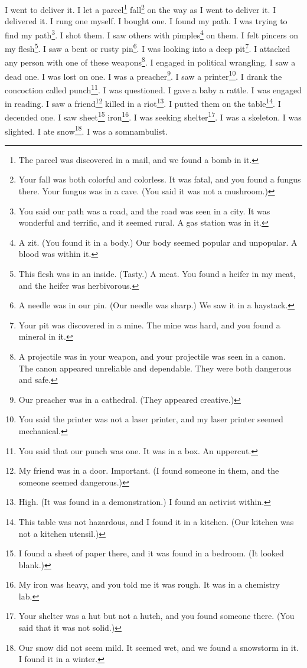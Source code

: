 \documentclass[12pt]{book}
\begin{document}
 I went to deliver it. I let a parcel\footnote{The parcel was discovered in a mail, and we found a bomb in it.} fall\footnote{Your fall was both colorful and colorless. It was fatal, and you found a fungus there. Your fungus was in a cave. (You said it was not a mushroom.)} on the way as I went to deliver it. I delivered it. I rung one myself. I bought one. I found my path. I was trying to find my path\footnote{You said our path was a road, and the road was seen in a city. It was wonderful and terrific, and it seemed rural. A gas station was in it.}. I shot them. I saw others with pimples\footnote{A zit. (You found it in a body.) Our body seemed popular and unpopular. A blood was within it.} on them. I felt pincers on my flesh\footnote{This flesh was in an inside. (Tasty.) A meat. You found a heifer in my meat, and the heifer was herbivorous.}. I saw a bent or rusty pin\footnote{A needle was in our pin. (Our needle was sharp.) We saw it in a haystack.}. I was looking into a deep pit\footnote{Your pit was discovered in a mine. The mine was hard, and you found a mineral in it.}. I attacked any person with one of these weapons\footnote{A projectile was in your weapon, and your projectile was seen in a canon. The canon appeared unreliable and dependable. They were both dangerous and safe.}. I engaged in political wrangling. I saw a dead one. I was lost on one. I was a preacher\footnote{Our preacher was in a cathedral. (They appeared creative.)}. I saw a printer\footnote{You said the printer was not a laser printer, and my laser printer seemed mechanical.}. I drank the concoction called punch\footnote{You said that our punch was one. It was in a box. An uppercut.}. I was questioned. I gave a baby a rattle. I was engaged in reading. I saw a friend\footnote{My friend was in a door. Important. (I found someone in them, and the someone seemed dangerous.)} killed in a riot\footnote{High. (It was found in a demonstration.) I found an activist within.}. I putted them on the table\footnote{This table was not hazardous, and I found it in a kitchen. (Our kitchen was not a kitchen utensil.)}. I decended one. I saw sheet\footnote{I found a sheet of paper there, and it was found in a bedroom. (It looked blank.)} iron\footnote{My iron was heavy, and you told me it was rough. It was in a chemistry lab.}. I was seeking shelter\footnote{Your shelter was a hut but not a hutch, and you found someone there. (You said that it was not solid.)}. I was a skeleton. I was slighted. I ate snow\footnote{Our snow did not seem mild. It seemed wet, and we found a snowstorm in it. I found it in a winter.}. I was a somnambulist. 
\end{document}
